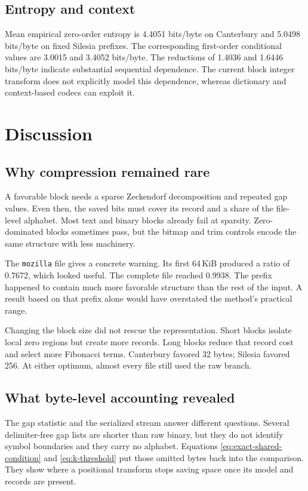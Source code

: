 \documentclass[a4paper,fleqn]{cas-dc}
\begin{document}
\subsection{Entropy and context}

Mean empirical zero-order entropy is 4.4051 bits/byte on Canterbury and 5.0498
bits/byte on fixed Silesia prefixes. The corresponding first-order conditional
values are 3.0015 and 3.4052 bits/byte. The reductions of 1.4036 and 1.6446
bits/byte indicate substantial sequential dependence. The current block
integer transform does not explicitly model this dependence, whereas
dictionary and context-based codecs can exploit it.

\section{Discussion}
\label{sec:discussion}

\subsection{Why compression remained rare}

A favorable block needs a sparse Zeckendorf decomposition and repeated gap
values. Even then, the saved bits must cover its record and a share of the
file-level alphabet. Most text and binary blocks already fail at sparsity.
Zero-dominated blocks sometimes pass, but the bitmap and trim controls encode
the same structure with less machinery.

The \texttt{mozilla} file gives a concrete warning. Its first 64\,KiB produced
a ratio of 0.7672, which looked useful. The complete file reached 0.9938.
The prefix happened to contain much more favorable structure than the rest of
the input. A result based on that prefix alone would have overstated the
method's practical range.

Changing the block size did not rescue the representation. Short blocks
isolate local zero regions but create more records. Long blocks reduce that
record cost and select more Fibonacci terms. Canterbury favored 32 bytes;
Silesia favored 256. At either optimum, almost every file still used the raw
branch.

\subsection{What byte-level accounting revealed}

The gap statistic and the serialized stream answer different questions.
Several delimiter-free gap lists are shorter than raw binary, but they do not
identify symbol boundaries and they carry no alphabet. Equations
\eqref{eq:exact-shared-condition} and \eqref{eq:k-threshold} put those omitted
bytes back into the comparison. They show where a positional transform stops
saving space once its model and records are present.
\end{document}
